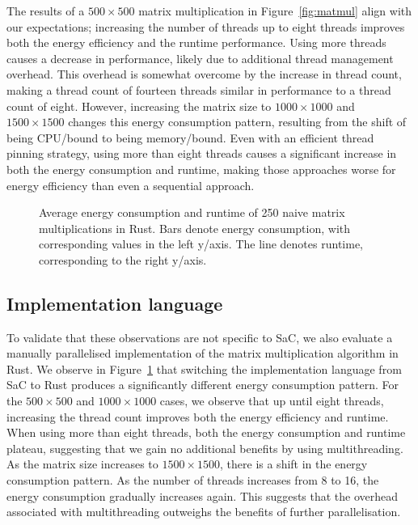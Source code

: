 The results of a $\num{500} \times \num{500}$ matrix multiplication in Figure~\ref{fig:matmul} align with our expectations; increasing the number of threads up to eight threads improves both the energy efficiency and the runtime performance.
Using more threads causes a decrease in performance, likely due to additional thread management overhead.
This overhead is somewhat overcome by the increase in thread count, making a thread count of fourteen threads similar in performance to a thread count of eight.
However, increasing the matrix size to $\num{1000} \times \num{1000}$ and $\num{1500} \times \num{1500}$ changes this energy consumption pattern, resulting from the shift of being CPU\-/bound to being memory\-/bound.
Even with an efficient thread pinning strategy, using more than eight threads causes a significant increase in both the energy consumption and runtime, making those approaches worse for energy efficiency than even a sequential approach.

\begin{figure}[ht]
  \scriptsize
  \begin{subfigure}{0.33\linewidth}
    \centering
  \end{subfigure}%
  \hfill
  \begin{subfigure}{0.33\linewidth}
    \centering
  \end{subfigure}%
  \hfill
  \begin{subfigure}{0.33\linewidth}
    \centering
  \end{subfigure}%
  \caption{Average energy consumption and runtime of 250 naive matrix multiplications in Rust.
  Bars denote energy consumption, with corresponding values in the left y\-/axis.
  The line denotes runtime, corresponding to the right y\-/axis.}%
  \label{fig:rust}
\end{figure}

\subsection{Implementation language}
To validate that these observations are not specific to SaC, we also evaluate a manually parallelised implementation of the matrix multiplication algorithm in Rust.
We observe in Figure~\ref{fig:rust} that switching the implementation language from SaC to Rust produces a significantly different energy consumption pattern.
For the $\num{500} \times \num{500}$ and $\num{1000} \times \num{1000}$ cases, we observe that up until eight threads, increasing the thread count improves both the energy efficiency and runtime.
When using more than eight threads, both the energy consumption and runtime plateau, suggesting that we gain no additional benefits by using multithreading.
As the matrix size increases to $\num{1500} \times \num{1500}$, there is a shift in the energy consumption pattern.
As the number of threads increases from 8 to 16, the energy consumption gradually increases again.
This suggests that the overhead associated with multithreading outweighs the benefits of further parallelisation.

